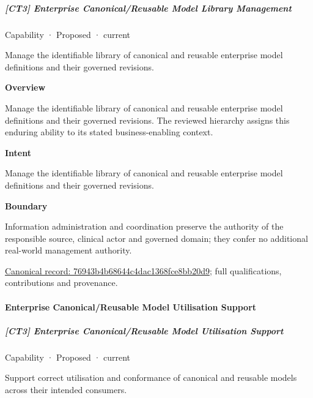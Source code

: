 \subparagraph{[CT3] Enterprise Canonical/Reusable Model Library Management}

\label{element:76943b4b68644c4dac1368fce8bb20d9}
{\small Capability · Proposed · current}\par

Manage the identifiable library of canonical and reusable enterprise model definitions and their governed revisions.



\textbf{Overview}



Manage the identifiable library of canonical and reusable enterprise model definitions and their governed revisions. The reviewed hierarchy assigns this enduring ability to its stated business-enabling context.



\textbf{Intent}



Manage the identifiable library of canonical and reusable enterprise model definitions and their governed revisions.



\textbf{Boundary}



Information administration and coordination preserve the authority of the responsible source, clinical actor and governed domain; they confer no additional real-world management authority.


{\footnotesize \href{../../../../continuum/strategy/capability/76943b4b68644c4dac1368fce8bb20d9.md}{Canonical record: 76943b4b68644c4dac1368fce8bb20d9}; full qualifications, contributions and provenance.}\par
\paragraph{Enterprise Canonical/Reusable Model Utilisation Support}

\subparagraph{[CT3] Enterprise Canonical/Reusable Model Utilisation Support}

\label{element:5744cb9d86494064af87afb3cbf2cf97}
{\small Capability · Proposed · current}\par

Support correct utilisation and conformance of canonical and reusable models across their intended consumers.



